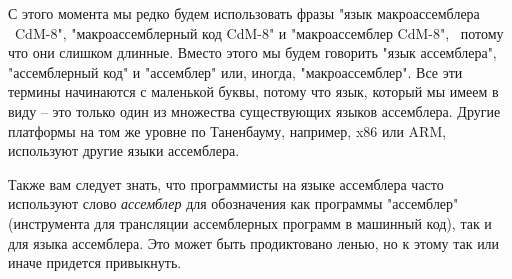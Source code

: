 С этого момента мы редко будем использовать фразы "язык макроассемблера  CdM-8", "макроассемблерный код CdM-8" и "макроассемблер CdM-8",  потому что они слишком длинные.  Вместо этого мы будем говорить "язык ассемблера", "ассемблерный код" и "ассемблер" или, иногда, "макроассемблер".  Все эти термины начинаются с маленькой буквы, потому что язык, который мы имеем в виду -- это только один из множества существующих языков ассемблера.  Другие платформы на том же уровне по Таненбауму, например, x86 или ARM, используют другие языки ассемблера.  

Также вам следует знать, что программисты на языке ассемблера часто используют слово \emph{ассемблер} для обозначения как программы "ассемблер" (инструмента для трансляции ассемблерных программ в машинный код), так и для языка ассемблера.  Это может быть продиктовано ленью, но к этому так или иначе придется привыкнуть.